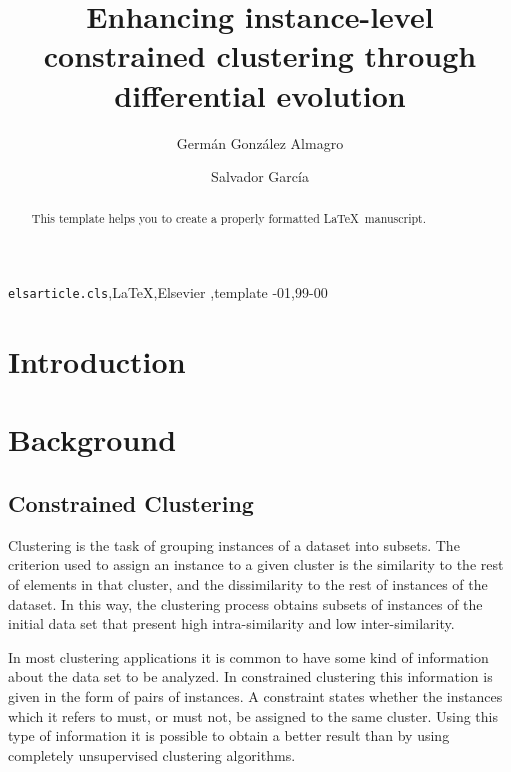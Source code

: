 \documentclass[review]{elsarticle}
\begin{document}
\begin{frontmatter}

\title{Enhancing instance-level constrained clustering through differential evolution}

\author[mymainaddress]{Germ\'an Gonz\'alez Almagro}

\author[mymainaddress]{Salvador Garc\'ia}

\address[mymainaddress]{Department of Computer Science and Artificial Intelligence, University of Granada, 18071 Granada, Spain}

\begin{abstract}
This template helps you to create a properly formatted \LaTeX\ manuscript.
\end{abstract}

\begin{keyword}
\texttt{elsarticle.cls}\sep \LaTeX\sep Elsevier \sep template
-01\sep  99-00
\end{keyword}

\end{frontmatter}

\linenumbers

\section{Introduction}

\section{Background}

\subsection{Constrained Clustering}

Clustering is the task of grouping instances of a dataset into subsets. The criterion used to assign an instance to a given cluster is the similarity to the rest of elements in that cluster, and the dissimilarity to the rest of instances of the dataset. In this way, the clustering process obtains subsets of instances of the initial data set that present high intra-similarity and low inter-similarity.

In most clustering applications it is common to have some kind of information about the data set to be analyzed. In constrained clustering this information is given in the form of pairs of instances. A constraint states whether the instances which it refers to must, or must not, be assigned to the same cluster. Using this type of information it is possible to obtain a better result than by using completely unsupervised clustering algorithms.
\end{document}
